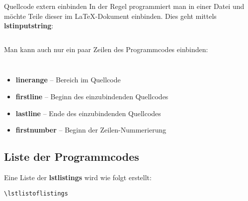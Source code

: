 \begin{frame}[fragile]{Quellcode extern einbinden}
In der Regel programmiert man in einer Datei und möchte Teile dieser im \LaTeX-Dokument einbinden. Dies geht mittels \textbf{lstinputstring}:

\begin{lstlisting}[style=tex, caption=lstlisting]
\end{lstlisting}

\pause Man kann auch nur ein paar Zeilen des Programmcodes einbinden:

\begin{lstlisting}[style=tex, firstnumber=2]
\end{lstlisting}

\begin{lstlisting}[style=tex, firstnumber=3]
\end{lstlisting}

\begin{itemize}
\item \textbf{linerange} -- Bereich im Quellcode
\item \textbf{firstline} -- Beginn des einzubindenden Quellcodes
\item \textbf{lastline} -- Ende des einzubindenden Quellcodes 
\item \textbf{firstnumber} -- Beginn der Zeilen-Nummerierung
\end{itemize}
\end{frame}

\subsection{Liste der Programmcodes}
\begin{frame}[fragile]
Eine Liste der \textbf{lstlistings} wird wie folgt erstellt:

\begin{lstlisting}[style=tex]
\lstlistoflistings\end{lstlisting}
\end{frame}

